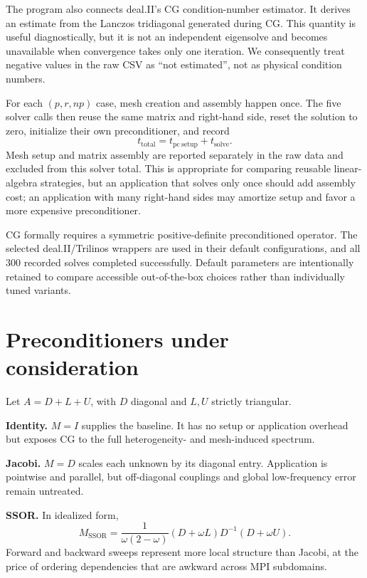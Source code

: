 \documentclass[10pt,a4paper]{article}
\begin{document}
The program also connects deal.II's CG condition-number estimator. It derives an estimate from
the Lanczos tridiagonal generated during CG. This quantity is useful diagnostically, but it is not
an independent eigensolve and becomes unavailable when convergence takes only one iteration.
We consequently treat negative values in the raw CSV as ``not estimated'', not as physical
condition numbers.

For each $(p,r,np)$ case, mesh creation and assembly happen once. The five solver calls then reuse
the same matrix and right-hand side, reset the solution to zero, initialize their own preconditioner,
and record
\begin{equation}
 t_{\mathrm{total}}=t_{\mathrm{pc\ setup}}+t_{\mathrm{solve}}.
\end{equation}
Mesh setup and matrix assembly are reported separately in the raw data and excluded from this
solver total. This is appropriate for comparing reusable linear-algebra strategies, but an application
that solves only once should add assembly cost; an application with many right-hand sides may
amortize setup and favor a more expensive preconditioner.

CG formally requires a symmetric positive-definite preconditioned operator. The selected
deal.II/Trilinos wrappers are used in their default configurations, and all 300 recorded solves
completed successfully. Default parameters are intentionally retained to compare accessible
out-of-the-box choices rather than individually tuned variants.

\newpage
\section{Preconditioners under consideration}
Let $A=D+L+U$, with $D$ diagonal and $L,U$ strictly triangular.

\textbf{Identity.} $M=I$ supplies the baseline. It has no setup or application overhead but exposes
CG to the full heterogeneity- and mesh-induced spectrum.

\textbf{Jacobi.} $M=D$ scales each unknown by its diagonal entry. Application is pointwise and
parallel, but off-diagonal couplings and global low-frequency error remain untreated.

\textbf{SSOR.} In idealized form,
\begin{equation}
 M_{\mathrm{SSOR}}=\frac{1}{\omega(2-\omega)}(D+\omega L)D^{-1}(D+\omega U).
\end{equation}
Forward and backward sweeps represent more local structure than Jacobi, at the price of ordering
dependencies that are awkward across MPI subdomains.
\end{document}
